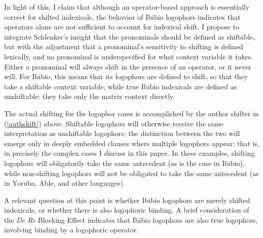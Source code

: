 \documentclass[output=paper]{langscibook}
\begin{document}
In light of this, I claim that although an operator-based approach is essentially correct for shifted indexicals, the behavior of Ibibio logophors indicates that operators alone are not sufficient to account for indexical shift. I propose to integrate Schlenker's insight that the pronominals should be defined as shiftable, but with the adjustment that a pronominal's sensitivity to shifting is defined lexically, and no pronominal is underspecified for what context variable it takes. Either a pronominal will always shift in the presence of an operator, or it never will. For Ibibio, this means that its logophors are defined to shift, so that they take a shiftable context variable, while true Ibibio indexicals are defined as unshiftable: they take only the matrix context directly.
\begin{exe}
	\ex \begin{xlist}
	\end{xlist}
\end{exe}
The actual shifting for the logophor cases is accomplished by the author shifter in (\ref{authshift}) above. Shiftable logophors will otherwise receive the same interpretation as unshiftable logophors; the distinction between the two will emerge only in deeply embedded clauses where multiple logophors appear; that is, in precisely the complex cases I discuss in this paper. In these examples, shifting logophors will obligatorily take the same antecedent (as is the case in Ibibio), while non-shifting logophors will not be obligated to take the same antecedent (as in Yoruba, Able, and other languages).

A relevant question at this point is whether Ibibio logophors are merely shifted indexicals, or whether there is also logophoric binding. A brief consideration of the \textit{De Re} Blocking Effect indicates that Ibibio logophors are also true logophors, involving binding by a logophoric operator.
\end{document}
